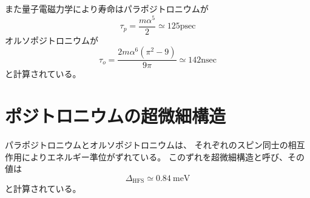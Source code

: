 また量子電磁力学により寿命はパラポジトロニウムが
\begin{equation}
	\nonumber
\tau_{p} = \frac{m \alpha^{5}}{2} \simeq 125 \mathrm{psec}
\end{equation}
オルソポジトロニウムが
\begin{equation}
	\nonumber
\tau_{o} = \frac{2m \alpha^{6}(\pi^{2}-9)}{9 \pi} \simeq 142 \mathrm{nsec}
\end{equation}
と計算されている。


\section{ポジトロニウムの超微細構造}

パラポジトロニウムとオルソポジトロニウムは、
それぞれのスピン同士の相互作用によりエネルギー準位がずれている。
このずれを超微細構造と呼び、その値は
\begin{equation}
	\nonumber
\Delta_{\mathrm{HFS}} \simeq 0.84\ \mathrm{meV}
\end{equation}
と計算されている。


